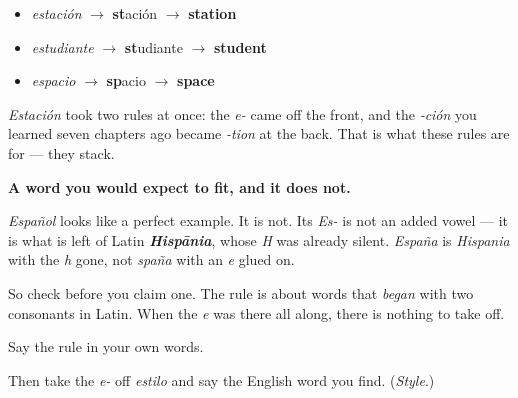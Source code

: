 \begin{itemize}
\raggedright
  \item \emph{estación} $\to$ \textbf{st}ación $\to$ \textbf{station}
  \item \emph{estudiante} $\to$ \textbf{st}udiante $\to$ \textbf{student}
  \item \emph{espacio} $\to$ \textbf{sp}acio $\to$ \textbf{space}
\end{itemize}

\emph{Estación} took two rules at once: the \emph{e-} came off the front, and the \emph{-ción} you learned seven chapters ago became \emph{-tion} at the back. That is what these rules are for — they stack.

\begin{culture}
\textbf{A word you would expect to fit, and it does not.}

\emph{Español} looks like a perfect example. It is not. Its \emph{Es-} is not an added vowel — it is what is left of Latin \emph{\textbf{Hispānia}}, whose \emph{H} was already silent. \emph{España} is \emph{Hispania} with the \emph{h} gone, not \emph{spaña} with an \emph{e} glued on.

So check before you claim one. The rule is about words that \emph{began} with two consonants in Latin. When the \emph{e} was there all along, there is nothing to take off.
\end{culture}

\begin{tcolorbox}[breakable,colback=teal!4,colframe=teal!35!black,title={Before you move on}]
Say the rule in your own words.

Then take the \emph{e-} off \emph{estilo} and say the English word you find. (\emph{Style}.)
\end{tcolorbox}

